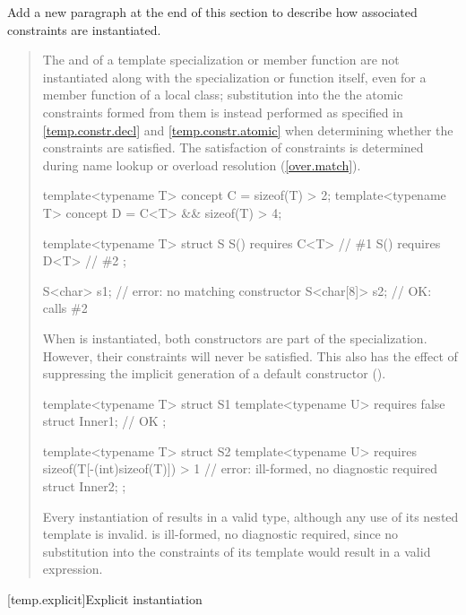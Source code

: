 Add a new paragraph at the end of this section to describe how associated
constraints are instantiated.

\begin{quote}
\begin{addedblock}
\setcounter{Paras}{15}
\pnum
The  and 
of a template specialization or member function are not
instantiated along with the specialization or function itself, even for a member
function of a local class;
substitution into the the atomic constraints formed from them is instead performed
as specified in \ref{temp.constr.decl} and \ref{temp.constr.atomic}
when determining whether the constraints are satisfied.
% 
\enternote
The satisfaction of constraints is determined during name lookup or overload
resolution (\ref{over.match}).
\exitnote
% 
\enterexample
\begin{codeblock}
template<typename T> concept C = sizeof(T) > 2;
template<typename T> concept D = C<T> && sizeof(T) > 4;

template<typename T> struct S {
  S() requires C<T> { } // \#1
  S() requires D<T> { } // \#2
};

S<char> s1;    // error: no matching constructor
S<char[8]> s2; // OK: calls \#2
\end{codeblock}

When  is instantiated, both constructors are part of the
specialization. However, their constraints will never be satisfied.
% 
This also has the effect of suppressing the implicit generation of a default
constructor ().
\exitexample
% 
\enterexample
\begin{codeblock}
template<typename T> struct S1 {
  template<typename U> requires false struct Inner1; // OK
};

template<typename T> struct S2 {
  template<typename U> 
    requires sizeof(T[-(int)sizeof(T)]) > 1 // error: ill-formed, no diagnostic required
      struct Inner2;
};
\end{codeblock}
Every instantiation of  results in a valid type, although any use 
of its nested  template is invalid.
% 
 is ill-formed, no diagnostic required, since no substitution into 
the constraints of its  template would result in a valid 
expression.
\exitexample
\end{addedblock}
\end{quote}


[temp.explicit]{Explicit instantiation}

